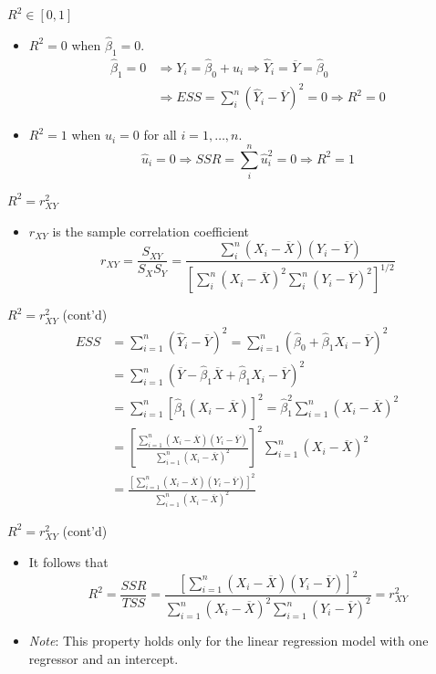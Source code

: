 \documentclass[presentation]{beamer}
\begin{document}
\begin{frame}[label={sec:org5455802}]{\(R^2 \in [0, 1]\)}
\begin{itemize}
\item \(R^2 = 0\) when \(\hat{\beta}_1 = 0\).
\begin{align*}
\hat{\beta}_1 = 0 &\Rightarrow Y_i = \hat{\beta}_0 + \hat{u}_i
\Rightarrow \hat{Y}_i = \overline{Y} = \hat{\beta}_0 \\ 
&\Rightarrow ESS
= \sum_i^n (\hat{Y}_i - \overline{Y})^2 = 0 \Rightarrow R^2 = 0
\end{align*}
\item \(R^2 = 1\) when \(\hat{u}_i = 0\) for all \(i = 1, \ldots, n\).
\[ \hat{u}_i = 0 \Rightarrow SSR = \sum_i^n \hat{u}_i^2 = 0
  \Rightarrow R^2 = 1 \]
\end{itemize}
\end{frame}

\begin{frame}[label={sec:org94ce40d}]{\(R^2 = r^2_{XY}\)}
\begin{itemize}
\item \(r_{XY}\) is the sample correlation coefficient
\[ r_{XY} = \frac{S_{XY}}{S_X S_Y} = \frac{\sum_i^n(X_i -
  \overline{X})(Y_i - \overline{Y})}{\left[\sum_i^n (X_i - \overline{X})^2 \sum_i^n (Y_i -
  \overline{Y})^2 \right]^{1/2}} \]
\end{itemize}
\end{frame}

\begin{frame}[label={sec:org64475ad}]{\(R^2 = r^2_{XY}\) (cont'd)}
\begin{align*}
ESS &= \sum_{i=1}^n (\hat{Y}_i - \overline{Y})^2 = \sum_{i=1}^n (\hat{\beta}_0 + \hat{\beta}_1 X_i - \overline{Y})^2 \\
&= \sum_{i=1}^n (\overline{Y} - \hat{\beta}_1 \overline{X} + \hat{\beta}_1 X_i - \overline{Y})^2 \\
&= \sum_{i=1}^n \left[ \hat{\beta}_1 (X_i - \overline{X}) \right]^2 = \hat{\beta}_1^2 \sum_{i=1}^n (X_i - \overline{X})^2 \\
&= \left[\frac{\sum_{i=1}^n (X_i - \overline{X})(Y_i - \overline{Y})}{\sum_{i=1}^n (X_i - \overline{X})^2}\right]^2 \sum_{i=1}^n (X_i - \overline{X})^2 \\
&= \frac{\left[ \sum_{i=1}^n (X_i - \overline{X})(Y_i - \overline{Y}) \right]^2}{\sum_{i=1}^n (X_i - \overline{X})^2}
\end{align*}
\end{frame}

\begin{frame}[label={sec:org03fa826}]{\(R^2 = r^2_{XY}\) (cont'd)}
\begin{itemize}
\item It follows that
\[
  R^2 = \frac{SSR}{TSS} = \frac{\left[ \sum_{i=1}^n (X_i - \overline{X})(Y_i - \overline{Y}) \right]^2}{\sum_{i=1}^n (X_i - \overline{X})^2 \sum_{i=1}^n (Y_i - \overline{Y})^2} = r^2_{XY}
  \]

\item \emph{Note}: This property holds only for the linear regression model
with \alert{one regressor and an intercept}.
\end{itemize}
\end{frame}
\end{document}
